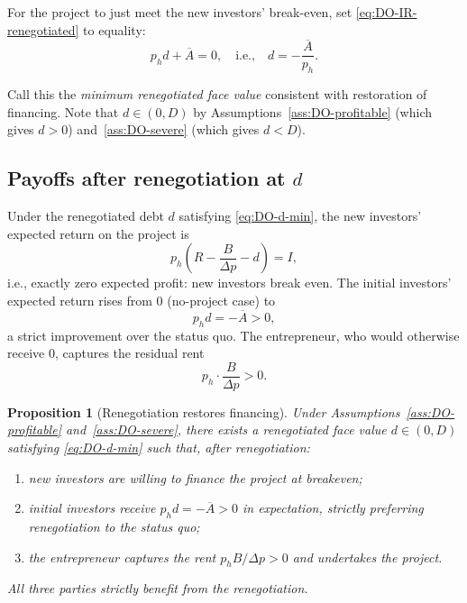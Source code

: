 \documentclass[11pt,a4paper,oneside]{book}
\theoremstyle{plain}
\newtheorem{proposition}[theorem]{Proposition}
\theoremstyle{definition}
\theoremstyle{remark}
\numberwithin{equation}{chapter}
\begin{document}
For the project to just meet the new investors' break-even, set \eqref{eq:DO-IR-renegotiated} to equality:
\begin{equation}\label{eq:DO-d-min}
  p_h d + \overline{A} = 0,
  \quad \text{i.e.,} \quad
  d = -\frac{\overline{A}}{p_h}.
\end{equation}

Call this the \emph{minimum renegotiated face value} consistent with restoration of financing.
Note that $d \in (0, D)$ by Assumptions~\ref{ass:DO-profitable} (which gives $d > 0$) and~\ref{ass:DO-severe} (which gives $d < D$).

\subsection{Payoffs after renegotiation at \texorpdfstring{$d$}{d}}

Under the renegotiated debt $d$ satisfying \eqref{eq:DO-d-min}, the new investors' expected return on the project is
\begin{equation}\label{eq:DO-new-zero}
  p_h \left( R - \frac{B}{\Delta p} - d \right) = I,
\end{equation}
i.e., exactly zero expected profit: new investors break even.
The initial investors' expected return rises from $0$ (no-project case) to
\begin{equation}\label{eq:DO-initial-gain}
  p_h d = -\overline{A} > 0,
\end{equation}
a strict improvement over the status quo.
The entrepreneur, who would otherwise receive $0$, captures the residual rent
\begin{equation}\label{eq:DO-entrepreneur-rent}
  p_h \cdot \frac{B}{\Delta p} > 0.
\end{equation}

\begin{proposition}[Renegotiation restores financing]\label{prop:DO-renegotiation}
Under Assumptions~\ref{ass:DO-profitable} and~\ref{ass:DO-severe}, there exists a renegotiated face value $d \in (0, D)$ satisfying \eqref{eq:DO-d-min} such that, after renegotiation:
\begin{enumerate}
  \item[\textup{(i)}] new investors are willing to finance the project at breakeven;
  \item[\textup{(ii)}] initial investors receive $p_h d = -\overline{A} > 0$ in expectation, strictly preferring renegotiation to the status quo;
  \item[\textup{(iii)}] the entrepreneur captures the rent $p_h B / \Delta p > 0$ and undertakes the project.
\end{enumerate}
All three parties strictly benefit from the renegotiation.
\end{proposition}
\end{document}
